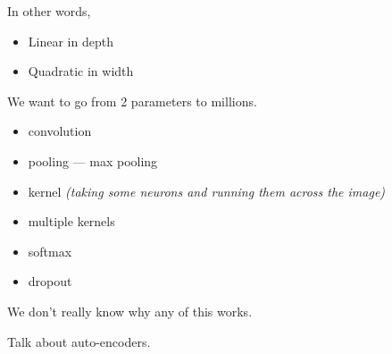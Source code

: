 In other words,
\begin{itemize}
\item Linear in depth
\item Quadratic in width
\end{itemize}



We want to go from 2 parameters to millions.

\begin{itemize}
\item convolution
\item pooling --- max pooling
\item kernel \textit{(taking some neurons and running them across the image)}
\item multiple kernels
\item softmax
\item dropout
\end{itemize}

We don't really know why any of this works.

Talk about auto-encoders.


